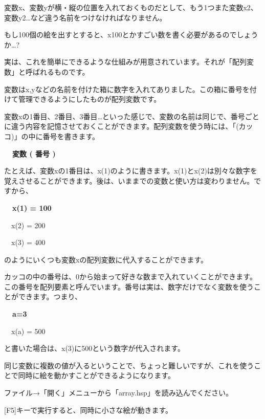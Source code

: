 \documentclass[a4paper,12pt]{jarticle}
\begin{document}
変数x、変数yが横・縦の位置を入れておくものだとして、もう1つまた変数x2、変数y2…など違う名前をつけなければなりません。

もし100個の絵を出すとすると、x100とかすごい数を書く必要があるのでしょうか…?


\bigskip

実は、これを簡単にできるような仕組みが用意されています。それが「配列変数」と呼ばれるものです。

変数はx,yなどの名前を付けた箱に数字を入れてありました。この箱に番号を付けて管理できるようにしたものが配列変数です。

変数xの1番目、2番目、3番目…といった感じで、変数の名前は同じで、番号ごとに違う内容を記憶させておくことができます。配列変数を使う時には、「(カッコ)」の中に番号を書きます。


\bigskip

{\bfseries
\ \ 変数 ( 番号 )}


\bigskip

たとえば、変数xの1番目は、x(1)のように書きます。x(1)とx(2)は別々な数字を覚えさせることができます。後は、いままでの変数と使い方は変わりません。ですから、


\bigskip

{\bfseries
\ \ x(1) = 100

\ \ x(2) = 200

\ \ x(3) = 400}


\bigskip

のようにいくつも変数xの配列変数に代入することができます。

カッコの中の番号は、0から始まって好きな数まで入れていくことができます。この番号を配列要素と呼んでいます。番号は実は、数字だけでなく変数を使うことができます。つまり、


\bigskip

{\bfseries
\ \ a=3

\ \ x(a) = 500}


\bigskip

と書いた場合は、x(3)に500という数字が代入されます。

同じ変数に複数の値が入るということで、ちょっと難しいですが、これを使うことで同時に絵を動かすことができるようになります。


\bigskip

ファイル→「開く」メニューから「array.hsp」を読み込んでください。

[F5]キーで実行すると、同時に小さな絵が動きます。

\bigskip
\bigskip
\end{document}
